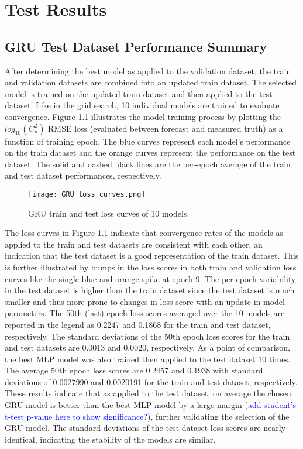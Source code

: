 \chapter{Test Results}
\label{ch5}

\section{GRU Test Dataset Performance Summary}
After determining the best model as applied to the validation dataset, the train and validation datasets are combined into an updated train dataset. The selected model is trained on the updated train dataset and then applied to the test dataset. Like in the grid search, 10 individual models are trained to evaluate convergence. Figure \ref{fig:GRU_train_test_loss_curves} illustrates the model training process by plotting the $log_{10}(C_{n}^{2})$ RMSE loss (evaluated between forecast and measured truth) as a function of training epoch. The blue curves represent each model's performance on the train dataset and the orange curves represent the performance on the test dataset. The solid and dashed black lines are the per-epoch average of the train and test dataset performances, respectively.
\begin{figure}[h!]
	\centering
	\texttt{[image: GRU\_loss\_curves.png]}
	\caption{GRU train and test loss curves of 10 models.}
	\label{fig:GRU_train_test_loss_curves}
\end{figure}
The loss curves in Figure \ref{fig:GRU_train_test_loss_curves} indicate that convergence rates of the models as applied to the train and test datasets are consistent with each other, an indication that the test dataset is a good representation of the train dataset. This is further illustrated by bumps in the loss scores in both train and validation loss curves like the single blue and orange spike at epoch 9. The per-epoch variability in the test dataset is higher than the train dataset since the test dataset is much smaller and thus more prone to changes in loss score with an update in model parameters. The 50th (last) epoch loss scores averaged over the 10 models are reported in the legend as 0.2247 and 0.1868 for the train and test dataset, respectively. The standard deviations of the 50th epoch loss scores for the train and test datasets are 0.0013 and 0.0020, respectively. As a point of comparison, the best MLP model was also trained then applied to the test dataset 10 times. The average 50th epoch loss scores are 0.2457 and 0.1938 with standard deviations of 0.0027990 and 0.0020191 for the train and test dataset, respectively. These results indicate that as applied to the test dataset, on average the chosen GRU model is better than the best MLP model by a large margin (\textcolor{blue}{add student's t-test p-value here to show significance?}), further validating the selection of the GRU model. The standard deviations of the test dataset loss scores are nearly identical, indicating the stability of the models are similar.

